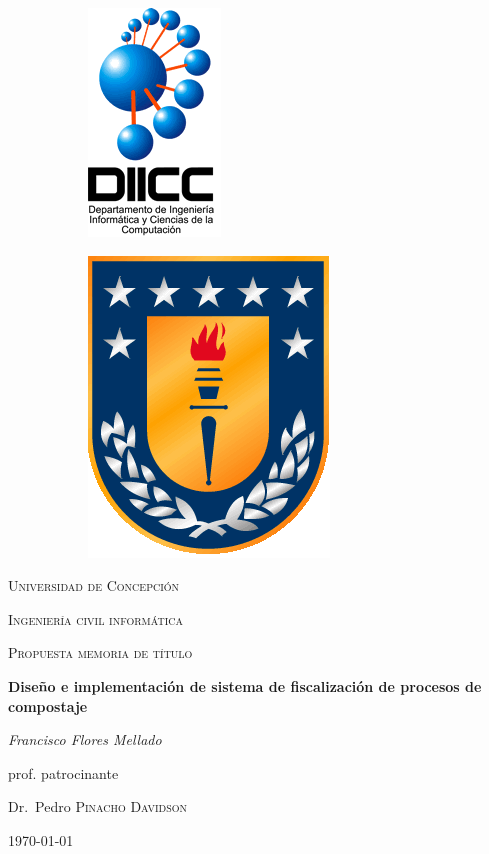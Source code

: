 \documentclass[12pt, letterpaper]{article}
\begin{document}
\begin{titlepage}
	\begin{figure}
		
		\begin{subfigure}[b]{0.5\textwidth}
			\includegraphics[scale=0.45]{figures/diicc.png}
		\end{subfigure}
		\hfill
		\begin{subfigure}[b]{0.1\textwidth}
			\includegraphics[scale=0.4]{figures/escudo_udec.png}
		\end{subfigure}
	\end{figure}
	
	\centering	
	\par\vspace{1cm}
	{\scshape\LARGE Universidad de Concepción \par}
	{\scshape Ingeniería civil informática \par}
	\vspace{1cm}
	{\scshape\Large Propuesta memoria de título\par}
	\vspace{1.5cm}
	{\huge\bfseries Diseño e implementación de sistema de fiscalización de procesos de compostaje\par}
	\vspace{2cm}
	{\Large\itshape Francisco Flores Mellado\par}
	\vfill
	prof. patrocinante\par
	Dr.~Pedro \textsc{Pinacho Davidson}

	\vfill

	{\large \today\par}
\end{titlepage}
\end{document}
